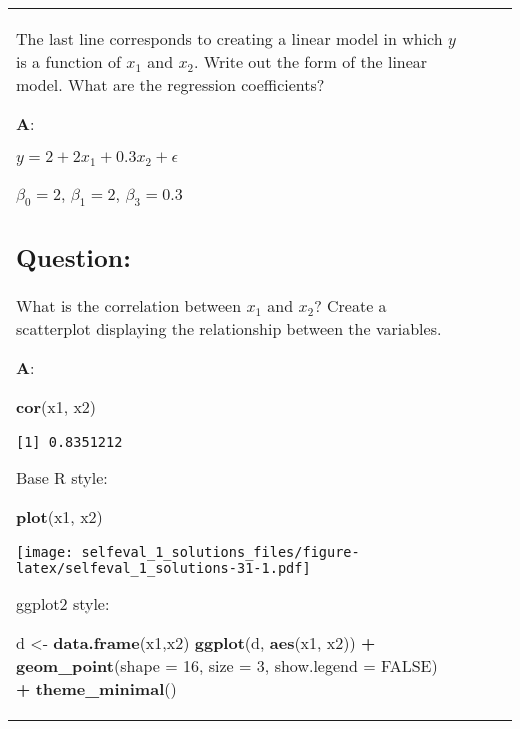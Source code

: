 \documentclass[12pt,]{article}
\newenvironment{Shaded}{\begin{snugshade}}{\end{snugshade}}
\newcommand{\DataTypeTok}[1]{\textcolor[rgb]{0.13,0.29,0.53}{#1}}
\newcommand{\DecValTok}[1]{\textcolor[rgb]{0.00,0.00,0.81}{#1}}
\newcommand{\KeywordTok}[1]{\textcolor[rgb]{0.13,0.29,0.53}{\textbf{#1}}}
\newcommand{\NormalTok}[1]{#1}
\newcommand{\OperatorTok}[1]{\textcolor[rgb]{0.81,0.36,0.00}{\textbf{#1}}}
\newcommand{\OtherTok}[1]{\textcolor[rgb]{0.56,0.35,0.01}{#1}}
\newcommand{\StringTok}[1]{\textcolor[rgb]{0.31,0.60,0.02}{#1}}
\begin{document}
\begin{tabularx}{0.5\textwidth}{p{} p{} p{} p{}}
The last line corresponds to creating a linear model in which \(y\) is a
function of \(x_1\) and \(x_2\). Write out the form of the linear model.
What are the regression coefficients?

\textbf{A}:

\(y = 2 +2x_1 + 0.3x_2 + \epsilon\)

\(\beta_0 = 2\), \(\beta_1 = 2\), \(\beta_3 = 0.3\)

\hypertarget{question-19}{%
\subsection{Question:}\label{question-19}}

What is the correlation between \(x_1\) and \(x_2\)? Create a
scatterplot displaying the relationship between the variables.

\textbf{A}:

\begin{Shaded}
\begin{Highlighting}[]
\KeywordTok{cor}\NormalTok{(x1, x2)}
\end{Highlighting}
\end{Shaded}

\begin{verbatim}
[1] 0.8351212
\end{verbatim}

Base R style:

\begin{Shaded}
\begin{Highlighting}[]
\KeywordTok{plot}\NormalTok{(x1, x2)}
\end{Highlighting}
\end{Shaded}

\texttt{[image: selfeval\_1\_solutions\_files/figure-latex/selfeval\_1\_solutions-31-1.pdf]}

ggplot2 style:

\begin{Shaded}
\begin{Highlighting}[]
\NormalTok{d <-}\StringTok{  }\KeywordTok{data.frame}\NormalTok{(x1,x2)}
\KeywordTok{ggplot}\NormalTok{(d, }\KeywordTok{aes}\NormalTok{(x1, x2)) }\OperatorTok{+}
\StringTok{  }\KeywordTok{geom_point}\NormalTok{(}\DataTypeTok{shape =} \DecValTok{16}\NormalTok{, }\DataTypeTok{size =} \DecValTok{3}\NormalTok{, }\DataTypeTok{show.legend =} \OtherTok{FALSE}\NormalTok{) }\OperatorTok{+}
\StringTok{  }\KeywordTok{theme_minimal}\NormalTok{() }
\end{Highlighting}
\end{Shaded}


\end{tabularx}
\end{document}
